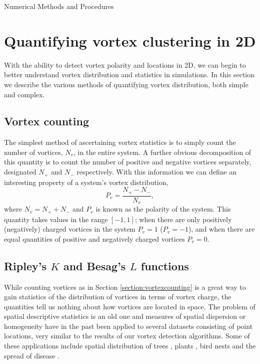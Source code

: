 \begin{chapter}{\label{cha:numerics}Numerical Methods and Procedures}
\section{\label{section:vortexclustering} Quantifying vortex clustering in 2D}
With the ability to detect vortex polarity and locations in 2D, we can begin to better understand vortex distribution and statistics in simulations. In this section we describe the various methods of quantifying vortex distribution, both simple and complex.
  \subsection{\label{section:vortexcounting} Vortex counting}
  The simplest method of ascertaining vortex statistics is to simply count the number of vortices, $N_v$, in the entire system. A further obvious decomposition of this quantity is to count the number of positive and negative vortices separately, designated $N_+$ and $N_-$ respectively. With this information we can define an interesting property of a system's vortex distribution,
  \begin{equation}
    P_v = \frac{N_+ - N_-}{N_v},
  \end{equation}
  where $N_v = N_+ + N_-$ and $P_v$ is known as the polarity of the system. This quantity takes values in the range $[-1,1]$; when there are only positively (negatively) charged vortices in the system $P_v=1$ ($P_v=-1$), and when there are equal quantities of positive and negatively charged vortices $P_v=0$.
  \subsection{\label{section:ripleysk} Ripley's $K$ and Besag's $L$ functions }
  While counting vortices as in Section \ref{section:vortexcounting} is a great way to gain statistics of the distribution of vortices in terms of vortex charge, the quantities tell us nothing about how vortices are located in space. The problem of spatial descriptive statistics is an old one and measures of spatial dispersion or homogeneity have in the past been applied to several datasets consisting of point locations, very similar to the results of our vortex detection algorithms. Some of these applications include spatial distribution of trees \cite{duncan_1993,peterson_1995,stoyan_2000}, plants \cite{stamp_1990}, bird nests \cite{gaines_2000} and the spread of disease \cite{diggle_1991}.



\end{chapter}
